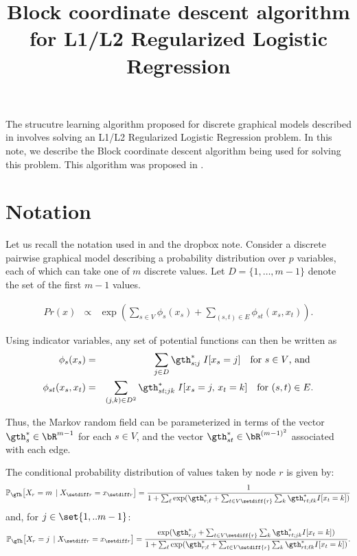 \documentclass{article}
\title{Block coordinate descent algorithm for L1/L2 Regularized Logistic Regression}
\date{}
\begin{document}
\maketitle

\abstract
The strucutre learning algorithm proposed for discrete graphical models described in \citet{ravikumarIsing09} involves solving an L1/L2 Regularized Logistic Regression problem. In this note, we describe the Block coordinate descent algorithm being used for solving this problem. This algorithm was proposed in \citet{meierRS2008}.

\section{Notation}
Let us recall the notation used in \citet{ravikumarIsing09} and the dropbox note\cite{pradeepDropbox}. Consider a discrete pairwise graphical model describing a probability distribution over $p$ variables, each of which can take one of $m$ discrete values. Let $D = \{1, \ldots, m-1 \}$ denote the set of the first $m-1$ values.

\begin{eqnarray}
\label{EqnGenMRF}
Pr(x) & \propto & \exp (\sum_{s \in V}
\phi_s(x_s) + \sum_{(s,t) \in E} \phi_{st}(x_s,x_t)).
\end{eqnarray}

Using indicator variables, any set of potential functions can then be written as
\begin{eqnarray*}
\phi_{s}(x_s) & = & \sum_{j \in D}
	\gth^*_{s;j} \; I[x_s = j] \quad \mbox{for $s \in
	V$, and } \\
%
\phi_{st}(x_s,x_t) & = & \sum_{(j,k) \in D^2} \gth^*_{st;jk} \; I[x_s = j,\,x_t = k] \quad
	\mbox{for $(s,t) \in E$.}
\end{eqnarray*}

Thus, the Markov random field can be parameterized in terms of the
vector $\gth^*_s \in \bR^{m-1}$ for each $s \in V$,
and the vector $\gth^*_{st} \in \bR^{(m-1)^2}$ associated
with each edge.

The conditional probability distribution of values taken by node $r$ is given by:
\begin{equation}
\mathbb{P}_\gTh \big[X_r = m \, \mid X_{\setdiff r} =
x_{\setdiff r}\big] = \frac{1}{1+\sum_{\ell}\exp(\gth_{r;\ell}^* +
\sum_{t \in V\setdiff \{r\}} \sum_{k} \gth^*_{r t;\ell
k} I[x_t = k])}
\end{equation}
and, for $j\in \set{1, .. m-1}$:
\begin{equation}
\mathbb{P}_\gTh \big[X_r = j \, \mid X_{\setdiff r} =
x_{\setdiff r}\big] = \frac{\exp(\gth_{r;j}^* +
\sum_{t \in V\setdiff \{r\}} \sum_{k} \gth^*_{r t;jk}
I[x_t = k])} {1+\sum_{\ell}\exp(\gth_{r;\ell}^* +
\sum_{t \in V\setdiff \{r\}} \sum_{k} \gth^*_{r t;\ell
k} I[x_t = k])}.\\
\label{EqnMultiClassLogistic}
\end{equation}
\end{document}
